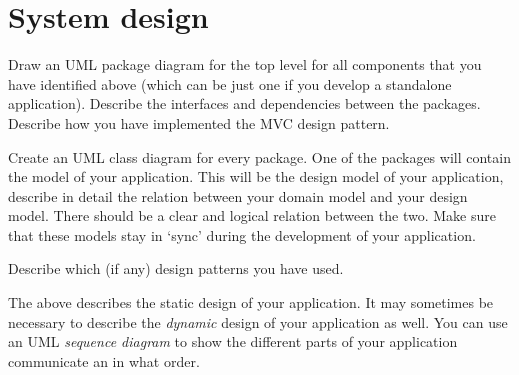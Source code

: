 \section{System design}

Draw an UML package diagram for the top level for all components that you have
identified above (which can be just one if you develop a standalone application).
Describe the interfaces and dependencies between the packages. Describe how you
have implemented the MVC design pattern.

Create an UML class diagram for every package. One of the packages will contain
the model of your application. This will be the design model of your
application, describe in detail the relation between your domain model and your
design model. There should be a clear and logical relation between the two. Make
sure that these models stay in `sync' during the development of your application.

Describe which (if any) design patterns you have used.

The above describes the static design of your application. It may sometimes be
necessary to describe the \emph{dynamic} design of your application as well. You
can use an UML \emph{sequence diagram} to show the different parts of your
application communicate an in what order.